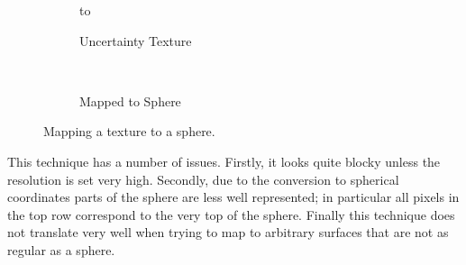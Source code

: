 \begin{figure}[H]
  \centering
  \begin{subfigure}[b]{0.5\textwidth}
    \vbox to \ht{}
    \caption{Uncertainty Texture}
    \label{fig:texturetexture}
  \end{subfigure}%
  ~ %
  \begin{subfigure}[b]{0.5\textwidth}
    \usebox{\mybox}
    \caption{Mapped to Sphere}
    \label{fig:texturesphere}
  \end{subfigure}
  \caption{Mapping a texture to a sphere.}\label{fig:uncertaintytexture}
\end{figure}

This technique has a number of issues. Firstly, it looks quite blocky unless the resolution is set very high. Secondly, due to the conversion to spherical coordinates parts of the sphere are less well represented; in particular all pixels in the top row correspond to the very top of the sphere. Finally this technique does not translate very well when trying to map to arbitrary surfaces that are not as regular as a sphere.


